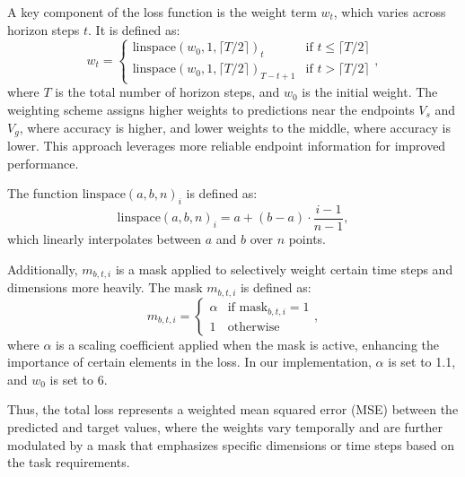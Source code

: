 A key component of the loss function is the weight term \( w_t \), which varies across horizon steps \( t \). It is defined as:
\begin{equation}
w_t = 
\begin{cases}
\text{linspace}(w_0, 1, \lceil T/2 \rceil)_t & \text{if } t \leq \lceil T/2 \rceil \\
\text{linspace}(w_0, 1, \lceil T/2 \rceil)_{T-t+1} & \text{if } t > \lceil T/2 \rceil
\end{cases},
\end{equation}
where \( T \) is the total number of horizon steps, and \( w_0 \) is the initial weight. The weighting scheme assigns higher weights to predictions near the endpoints \( V_s \) and \( V_g \), where accuracy is higher, and lower weights to the middle, where accuracy is lower. This approach leverages more reliable endpoint information for improved performance.

The function \( \text{linspace}(a, b, n)_i \) is defined as:
\begin{equation}
   \text{linspace}(a, b, n)_i = a + (b - a) \cdot \frac{i - 1}{n - 1}, 
\end{equation}
which linearly interpolates between \( a \) and \( b \) over \( n \) points.


Additionally, \( m_{b,t,i} \) is a mask applied to selectively weight certain time steps and dimensions more heavily. The mask \( m_{b,t,i} \) is defined as:
\begin{equation}
      m_{b,t,i} = \begin{cases}
    \alpha & \text{if mask}_{b,t,i} = 1 \\
    1 & \text{otherwise}
  \end{cases},
\end{equation}
where \( \alpha \) is a scaling coefficient applied when the mask is active, enhancing the importance of certain elements in the loss. In our implementation, \( \alpha \) is set to 1.1, and $w_0$ is set to 6.

Thus, the total loss represents a weighted mean squared error (MSE) between the predicted and target values, where the weights vary temporally and are further modulated by a mask that emphasizes specific dimensions or time steps based on the task requirements.

